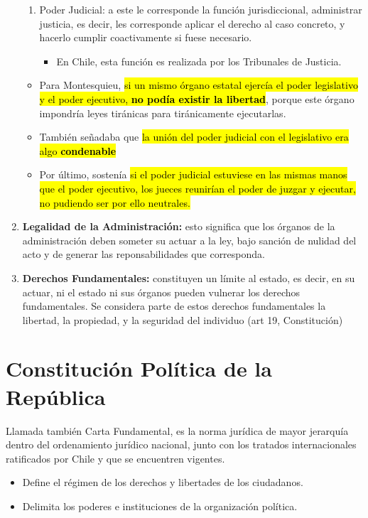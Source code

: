 \documentclass{templateApunte}
\newcommand{\hlcolor}[2]{{\sethlcolor{#1}\hl{#2}}}
\begin{document}
\begin{enumerate}
\begin{enumerate}
    \item Poder Judicial: a este le corresponde la función jurisdiccional, administrar justicia, es decir, les corresponde aplicar el derecho al caso concreto, y hacerlo cumplir coactivamente si fuese necesario.
    \begin{itemize}
      \item En Chile, esta función es realizada por los Tribunales de Justicia.
    \end{itemize}
  \end{enumerate}
  \begin{itemize}
    \item Para Montesquieu, \hlcolor{Amarillo!50}{si un mismo órgano estatal ejercía el poder legislativo y el poder ejecutivo, \textbf{ no podía existir la libertad}}, porque este órgano impondría leyes tiránicas para tir\'anicamente ejecutarlas.
    \item También se\~nadaba que \hlcolor{Amarillo!50}{la uni\'on del poder judicial con el legislativo era algo \textbf{condenable}}
    \item Por \'ultimo, sostenía \hlcolor{Amarillo!50}{si el poder judicial estuviese en las mismas manos que el poder ejecutivo, los jueces reunirían el poder de juzgar y ejecutar, no pudiendo ser por ello neutrales.}
  \end{itemize}

  \item \textbf{Legalidad de la Administración:} esto significa que los órganos de la administración deben someter su actuar a la ley, bajo sanción de nulidad del acto y de generar las reponsabilidades que corresponda.
  
  \item \textbf{Derechos Fundamentales:} constituyen un l\'imite al estado, es decir, en su actuar, ni el estado ni sus órganos pueden vulnerar los derechos fundamentales. Se considera parte de estos derechos fundamentales la libertad, la propiedad, y la seguridad del individuo (art 19, Constitución)
\end{enumerate}

\newpage
\section{Constitución Política de la República}
Llamada también Carta Fundamental, es la norma jurídica de mayor jerarquía dentro del ordenamiento jurídico nacional, junto con los tratados internacionales ratificados por Chile y que se encuentren vigentes.
\begin{itemize}
  \item Define el régimen de los derechos y libertades de los ciudadanos.
  \item Delimita los poderes e instituciones de la organización política.
\end{itemize}
\end{document}

